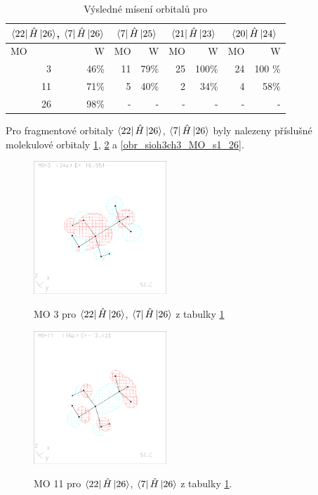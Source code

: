 \documentclass[
  digital, %
  table,   %
  lof,     %
  lot,     %
]{fithesis3}
\begin{document}
\begin{table}[htbp]
\caption{Výsledné mísení orbitalů pro }
\begin{center}
\begin{tabular}{|r|r|r|r|r|r|r|r|}
\hline
\multicolumn{2}{|c|}{$\bra{22}{\hat{H}}\ket{26}$, $\bra{7}{\hat{H}}\ket{26}$} & \multicolumn{2}{|c|}{$\bra{7}{\hat{H}}\ket{25}$}& \multicolumn{2}{|c|}{$\bra{21}{\hat{H}}\ket{23}$} &\multicolumn{2}{|c|}{$\bra{20}{\hat{H}}\ket{24}$} \\
\hline
\hline
\multicolumn{1}{|l|}{MO} & \multicolumn{1}{r|}{W} & \multicolumn{1}{l|}{MO} & \multicolumn{1}{r|}{W} & MO & \multicolumn{1}{r|}{W}& MO & \multicolumn{1}{r|}{W} \\ \hline
3 & 46\% & 11 & 79\% &25 & 100\%& 24 & 100 \% \\ \hline
11 & 71\% & 5 & 40\% & 2 & 34\% &4 & 58\% \\ \hline
26 & 98\% & - & - &  -& - &-&- \\ \hline
\end{tabular}
\end{center}
\label{tab_sioh3ch3_vysledky}
\end{table}

 Pro fragmentové orbitaly $\bra{22}{\hat{H}}\ket{26}$, $\bra{7}{\hat{H}}\ket{26}$ byly nalezeny příslušné molekulové orbitaly \ref{obr_sioh3ch3_MO_s1_3}, \ref{obr_sioh3ch3_MO_s1_11} a \ref{obr_sioh3ch3_MO_s1_26}.
  
  \begin{figure}[h]
\caption{MO 3 pro $\bra{22}{\hat{H}}\ket{26}$, $\bra{7}{\hat{H}}\ket{26}$ z tabulky \ref{tab_sioh3ch3_vysledky}}
  \center
  \includegraphics[width=5cm]{sioh3ch3_obrazky/s1_3.eps}
  \label{obr_sioh3ch3_MO_s1_3}
  \end{figure}

\begin{figure}[h]
\caption{MO 11 pro $\bra{22}{\hat{H}}\ket{26}$, $\bra{7}{\hat{H}}\ket{26}$ z tabulky \ref{tab_sioh3ch3_vysledky}.  }
  \center
  \includegraphics[width=5cm]{sioh3ch3_obrazky/s1_11.eps}
  \label{obr_sioh3ch3_MO_s1_11}
  \end{figure}
\end{document}
